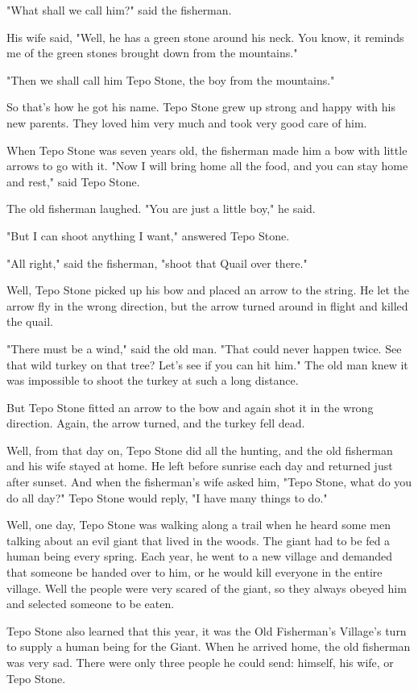 "What shall we call him?" said the fisherman.

His wife said, "Well, he has a green stone around his neck. You know, it reminds me of the green stones brought down from the mountains."

"Then we shall call him Tepo Stone, the boy from the mountains."

So that's how he got his name. Tepo Stone grew up strong and happy with his new parents. They loved him very much and took very good care of him.

When Tepo Stone was seven years old, the fisherman made him a bow with little arrows to go with it. "Now I will bring home all the food, and you can stay home and rest," said Tepo Stone.

The old fisherman laughed. "You are just a little boy," he said.

"But I can shoot anything I want," answered Tepo Stone.

"All right," said the fisherman, "shoot that Quail over there."

Well, Tepo Stone picked up his bow and placed an arrow to the string. He let the arrow fly in the wrong direction, but the arrow turned around in flight and killed the quail.

"There must be a wind," said the old man. "That could never happen twice. See that wild turkey on that tree? Let's see if you can hit him." The old man knew it was impossible to shoot the turkey at such a long distance.

But Tepo Stone fitted an arrow to the bow and again shot it in the wrong direction. Again, the arrow turned, and the turkey fell dead.

Well, from that day on, Tepo Stone did all the hunting, and the old fisherman and his wife stayed at home. He left before sunrise each day and returned just after sunset. And when the fisherman's wife asked him, "Tepo Stone, what do you do all day?" Tepo Stone would reply, "I have many things to do."

Well, one day, Tepo Stone was walking along a trail when he heard some men talking about an evil giant that lived in the woods. The giant had to be fed a human being every spring. Each year, he went to a new village and demanded that someone be handed over to him, or he would kill everyone in the entire village. Well the people were very scared of the giant, so they always obeyed him and selected someone to be eaten.

Tepo Stone also learned that this year, it was the Old Fisherman's Village's turn to supply a human being for the Giant. When he arrived home, the old fisherman was very sad. There were only three people he could send: himself, his wife, or Tepo Stone.

